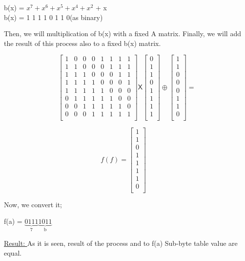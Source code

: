 \documentclass[11pt]{article}
\begin{document}
\begin{center}
  b(x) = $x^{7} + x^{6} + x^{5} + x^{4} + x^{2}$ + x\\
  \bigskip
  b(x) = 1 1 1 1 0 1 1 0(as binary)
\end{center}

Then, we will multiplication of b(x) with a fixed A matrix.  Finally, we will add the result of this process also to a fixed b(x) matrix.\\

\begin{center}
  \[
\begin{bmatrix}
  1& 0& 0& 0& 1& 1& 1& 1\\
  1& 1& 0& 0& 0& 1& 1& 1\\
  1& 1& 1& 0& 0& 0& 1& 1\\
  1& 1& 1& 1& 0& 0& 0& 1\\
  1& 1& 1& 1& 1& 0& 0& 0\\
  0& 1& 1& 1& 1& 1& 0& 0\\
  0& 0& 1& 1& 1& 1& 1& 0\\
  0& 0& 0& 1& 1& 1& 1& 1\\ 
\end{bmatrix}
\mathsf{X}
\begin{bmatrix}
  0\\
  1\\
  1\\
  0\\
  1\\
  1\\
  1\\
  1\\  
\end{bmatrix} 
\oplus 
\begin{bmatrix}
  1\\
  1\\
  0\\
  0\\
  0\\
  1\\
  1\\
  0\\ 
\end{bmatrix}
=
\]
\end{center}

\begin{center}
  $$f(f) = 
  \begin{bmatrix} 
   1\\
   1\\
   0\\
   1\\
   1\\
   1\\
   1\\
   0\\
  
  \end{bmatrix}
  \quad
  $$
\end{center}

Now, we convert it;\\

\begin{center}
  f(a) = $\underbrace{0 1 1 1}_\text{7} \underbrace{1 0 1 1}_\text{b}  $
\end{center}

\underline{Result: } As it is seen, result of the process and to f(a) Sub-byte table value are equal.
\end{document}
